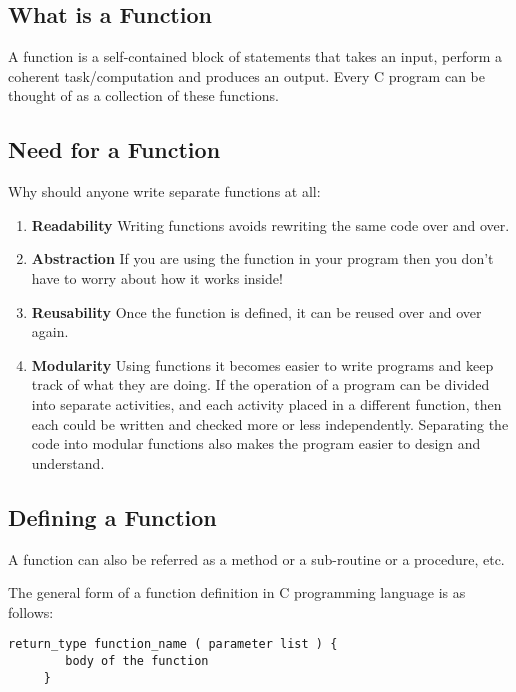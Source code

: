 \subsection{What is a Function}
A function is a self-contained block of statements that takes an input, perform a coherent task/computation and produces an output. Every C program can be thought of as a collection of these functions. 

\subsection{Need for a Function}
Why should anyone write separate functions at all:
\begin{enumerate}
    \item \textbf{Readability} Writing functions avoids rewriting the same code over and over.
    \item \textbf{Abstraction} If you are using the function in your program then you don't have to worry about how it works inside!
    \item \textbf{Reusability} Once the function is defined, it can be reused over and over again.
    \item \textbf{Modularity} Using functions it becomes easier to write programs and keep track of what they are doing. If the operation of a program can be divided into separate activities, and each activity placed in a different function, then each could be written and checked more or less independently. Separating the code into modular functions also makes the program easier to design and understand.
\end{enumerate}

\subsection{Defining a Function}
A function can also be referred as a method or a sub-routine or a procedure, etc.

\par The general form of a function definition in C programming language is as follows:
\begin{lstlisting}[style=CStyle]
    return_type function_name ( parameter list ) {
        body of the function
     }
\end{lstlisting}

